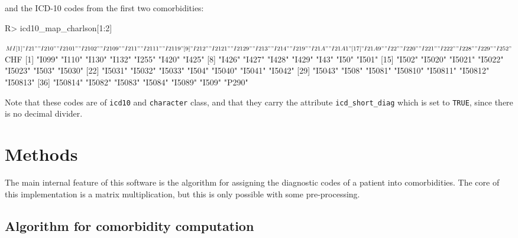 \documentclass[article]{jss}
\begin{document}
and the ICD-10 codes from the first two comorbidities:

\begin{CodeChunk}

\begin{CodeInput}
R> icd10_map_charlson[1:2]
\end{CodeInput}

\begin{CodeOutput}
$MI
 [1] "I21"   "I210"  "I2101" "I2102" "I2109" "I211"  "I2111" "I2119"
 [9] "I212"  "I2121" "I2129" "I213"  "I214"  "I219"  "I21A"  "I21A1"
[17] "I21A9" "I22"   "I220"  "I221"  "I222"  "I228"  "I229"  "I252" 

$CHF
 [1] "I099"   "I110"   "I130"   "I132"   "I255"   "I420"   "I425"  
 [8] "I426"   "I427"   "I428"   "I429"   "I43"    "I50"    "I501"  
[15] "I502"   "I5020"  "I5021"  "I5022"  "I5023"  "I503"   "I5030" 
[22] "I5031"  "I5032"  "I5033"  "I504"   "I5040"  "I5041"  "I5042" 
[29] "I5043"  "I508"   "I5081"  "I50810" "I50811" "I50812" "I50813"
[36] "I50814" "I5082"  "I5083"  "I5084"  "I5089"  "I509"   "P290"  
\end{CodeOutput}
\end{CodeChunk}

Note that these codes are of \texttt{icd10} and \texttt{character}
class, and that they carry the attribute \texttt{icd\_short\_diag} which
is set to \texttt{TRUE}, since there is no decimal divider.

\hypertarget{methods}{%
\section{Methods}\label{methods}}

The main internal feature of this software is the algorithm for
assigning the diagnostic codes of a patient into comorbidities. The core
of this implementation is a matrix multiplication, but this is only
possible with some pre-processing.

\hypertarget{algorithm-for-comorbidity-computation}{%
\subsection{Algorithm for comorbidity
computation}\label{algorithm-for-comorbidity-computation}}
\end{document}
